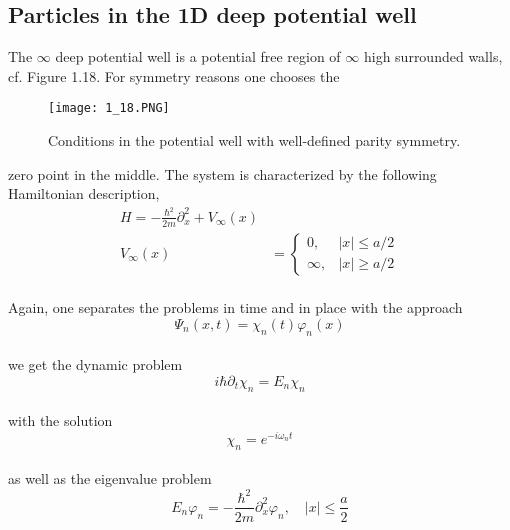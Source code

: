 \subsection{Particles in the 1D deep potential well}
The $\infty$ deep potential well is a potential free region of $\infty$ high surrounded walls, cf. Figure  1.18. For symmetry reasons one chooses the
\begin{figure}[ht]
    \centering
    \texttt{[image: 1\_18.PNG]}
    \caption{Conditions in the potential well with well-defined parity symmetry.}
    \label{fig:1.18}
\end{figure}
zero point in the middle. The system is characterized by the following Hamiltonian
description,
\\
\begin{equation}
\begin{aligned} H=-\frac{\hbar^{2}}{2 m} \partial_{x}^{2}+V_{\infty}(x) & \\ V_{\infty}(x) &=\left\{\begin{array}{ll}{0,} & {|x| \leq a / 2} \\ {\infty,} & {|x| \geq a / 2}\end{array}\right.\end{aligned}
\end{equation}\\
Again, one separates the problems in time and in place with the approach
\\
\begin{equation}
\Psi_{n}(x, t)=\chi_{n}(t) \varphi_{n}(x)
\end{equation}\\
we get the dynamic problem
\\
\begin{equation}
i \hbar \partial_{t} \chi_{n}=E_{n} \chi_{n}
\end{equation}\\
with the solution
\\
\begin{equation}
\chi_{n}=e^{-i \omega_{n} t}
\end{equation}\\
as well as the eigenvalue problem
\\
\begin{equation}
E_{n} \varphi_{n}=-\frac{\hbar^{2}}{2 m} \partial_{x}^{2} \varphi_{n}, \quad|x| \leq \frac{a}{2}
\end{equation}\\
